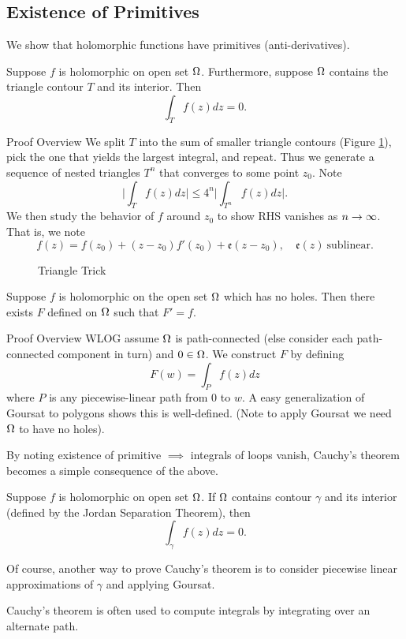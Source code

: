 \subsection{Existence of Primitives}
We show that holomorphic functions have primitives (anti-derivatives).
\begin{lem}[Goursat]
    Suppose $f$ is holomorphic on open set $\Omega$. Furthermore, suppose $\Omega$ contains the triangle contour $T$ and its interior. Then
    \[
        \int_T f(z) dz = 0.
    \]
\end{lem}
\begin{details}{Proof Overview}
    We split $T$ into the sum of smaller triangle contours (Figure \ref{fig:triangle_trick}), pick the one that yields the largest integral, and repeat. Thus we generate a sequence of nested triangles $T^n$ that converges to some point $z_0$. Note
    \[
        \Big| \int_T f(z) dz \Big| \leq 4^n \Big| \int_{T^n} f(z) dz \Big|.
    \]
    We then study the behavior of $f$ around $z_0$ to show RHS vanishes as $n \rightarrow \infty$. That is, we note
    \[
        f(z) = f(z_0) + (z-z_0)f'(z_0) + \mathfrak e(z-z_0), \quad \mathfrak e(z) \ \text{sublinear.}
    \]
\end{details}
\begin{figure}[ht]
    \centering
    \caption{Triangle Trick}
    \label{fig:triangle_trick}
\end{figure}
\begin{thm}
    \label{existence-of-primitives}
    Suppose $f$ is holomorphic on the open set $\Omega$ which has no holes. Then there exists $F$ defined on $\Omega$ such that $F' = f$.
\end{thm}
\begin{details}{Proof Overview}
    WLOG assume $\Omega$ is path-connected (else consider each path-connected component in turn) and $0 \in \Omega$. We construct $F$ by defining
    \[
        F(w) = \int_P f(z)dz
    \]
    where $P$ is any piecewise-linear path from $0$ to $w$. A easy generalization of Goursat to polygons shows this is well-defined. (Note to apply Goursat we need $\Omega$ to have no holes).
\end{details}

By noting existence of primitive $\implies$ integrals of loops vanish, Cauchy's theorem becomes a simple consequence of the above.
\begin{cor}
    Suppose $f$ is holomorphic on open set $\Omega$. If $\Omega$ contains contour $\gamma$ and its interior (defined by the Jordan Separation Theorem), then
    \[
        \int_\gamma f(z) dz = 0.
    \]
\end{cor}
Of course, another way to prove Cauchy's theorem is to consider piecewise linear approximations of $\gamma$ and applying Goursat.
\begin{remark}
    Cauchy's theorem is often used to compute integrals by integrating over an alternate path.
\end{remark}
